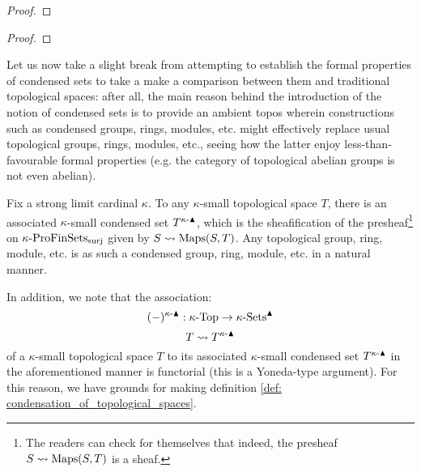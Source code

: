                 \begin{proof}
                    
                \end{proof}
            \begin{proposition} \label{prop: increasing_the_cardinal_bound_on_condensed_sets}
                
            \end{proposition}
                \begin{proof}
                    
                \end{proof}
                
            Let us now take a slight break from attempting to establish the formal properties of condensed sets to take a make a comparison between them and traditional topological spaces: after all, the main reason behind the introduction of the notion of condensed sets is to provide an ambient topos wherein constructions such as condensed groups, rings, modules, etc. might effectively replace usual topological groups, rings, modules, etc., seeing how the latter enjoy less-than-favourable formal properties (e.g. the category of topological abelian groups is not even abelian).
            \begin{remark} \label{remark: topological_spaces_and_condensed_sets}
                Fix a strong limit cardinal $\kappa$. To any $\kappa$-small topological space $T$, there is an associated $\kappa$-small condensed set $T^{\kappa\text{-}\blacktriangle}$, which is the sheafification of the presheaf\footnote{The readers can check for themselves that indeed, the presheaf $S \leadsto \mathrm{Maps}(S, T)$ is a sheaf.} on $\kappa\text{-}\mathrm{Pro}\mathrm{Fin}\mathrm{Sets}_{\mathrm{surj}}$ given by $S \leadsto \mathrm{Maps}(S, T)$. Any topological group, ring, module, etc. is as such a condensed group, ring, module, etc. in a natural manner. 
                
                In addition, we note that the association:
                    $$(-)^{\kappa\text{-}\blacktriangle}: \kappa\text{-}\mathrm{Top} \to \kappa\text{-}\mathrm{Sets}^{\blacktriangle}$$
                    $$T \leadsto T^{\kappa\text{-}\blacktriangle}$$
                of a $\kappa$-small topological space $T$ to its associated $\kappa$-small condensed set $T^{\kappa\text{-}\blacktriangle}$ in the aforementioned manner is functorial (this is a Yoneda-type argument). For this reason, we have grounds for making definition \ref{def: condensation_of_topological_spaces}. 
            \end{remark}
